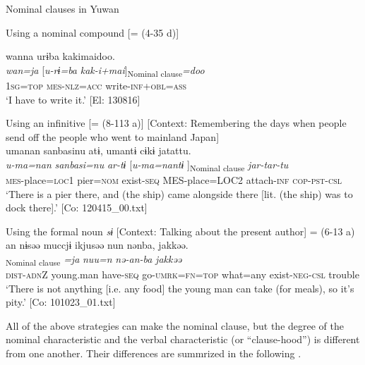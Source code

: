 \ea\label{ex:11-4}  Nominal clauses in Yuwan

  \ea Using a nominal compound [= (4-35 d)]
  
      \glll    wanna  urɨba  kakimaidoo.\\
    \textit{wan=ja}  [\textit{u-rɨ=ba}  \textit{kak-i+mai}]\textsubscript{Nominal clause}\textit{=doo}\\
    1\textsc{sg}=\textsc{top}  \textsc{mes}-\textsc{nlz}=\textsc{acc}  write-\textsc{inf}+\textsc{obl}=\textsc{ass}\\
    \glt     ‘I have to write it.’ [El: 130816]

  \ex Using an infinitive [= (8-113 a)]  [Context: Remembering the days when people send off the people who went to mainland Japan]\\
  
      \glll    umanan  sanbasinu  atɨ,  umantɨ  cɨkɨ  jatattu.\\
    \textit{u-ma=nan}  \textit{sanbasi=nu}  \textit{ar-tɨ}    [\textit{u-ma=nantɨ}  \textit{}]\textsubscript{Nominal clause}  \textit{jar-tar-tu}\\
    \textsc{mes}-place=\textsc{loc}1  pier=\textsc{nom}  exist-\textsc{seq}  MES-place=LOC2  attach-\textsc{inf}  \textsc{cop}-\textsc{pst}-\textsc{csl}\\
    \glt  ‘There is a pier there, and (the ship) came alongside there [lit. (the ship) was to dock there].’    [Co: 120415\_00.txt]

  \ex Using the formal noun \textit{sɨ}   [Context: Talking about the present author] = (6-13 a)\\
  
      \glll    an  nɨsəə  muccjɨ  ikjusəə  nun   nənba,  jakkəə.\\
    [\textit{a-n}  \textit{nəɨsəə}  \textit{mut-tɨ}  \textit{\Highlight{ik-jur=sɨ}}]\textsubscript{Nominal clause} \textit{=ja}  \textit{nuu=n}   \textit{nə-an-ba}  \textit{jakkəə}\\
    \textsc{dist}-\textsc{adn}Z  young.man  have-\textsc{seq}  go-\textsc{umrk}=\textsc{fn}=\textsc{top}  what=any  exist-\textsc{neg}-\textsc{csl}  trouble\\
    \glt    ‘There is not anything [i.e. any food] the young man can take (for meals), so it’s pity.’    [Co: 101023\_01.txt]
\z
\z

All of the above strategies can make the nominal clause, but the degree of the nominal characteristic and the verbal characteristic (or “clause-hood”) is different from one another. Their differences are summrized in the following .

